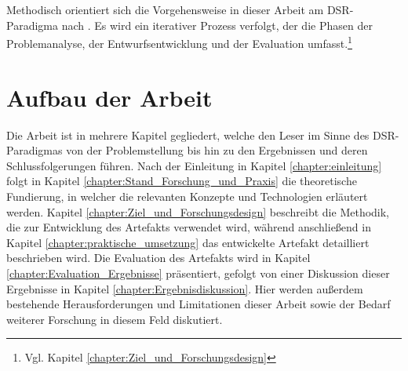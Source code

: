 Methodisch orientiert sich die Vorgehensweise in dieser Arbeit am \ac{DSR}-Paradigma nach \cite{hevner_design_2004}. Es wird ein iterativer Prozess verfolgt, der die Phasen der Problemanalyse, der Entwurfsentwicklung und der Evaluation umfasst.\footnote{Vgl. Kapitel \ref{chapter:Ziel_und_Forschungsdesign}}

\section{Aufbau der Arbeit}

Die Arbeit ist in mehrere Kapitel gegliedert, welche den Leser im Sinne des \ac{DSR}-Paradigmas von der Problemstellung bis hin zu den Ergebnissen und deren Schlussfolgerungen führen. Nach der Einleitung in Kapitel \ref{chapter:einleitung} folgt in Kapitel \ref{chapter:Stand_Forschung_und_Praxis} die theoretische Fundierung, in welcher die relevanten Konzepte und Technologien erläutert werden. Kapitel \ref{chapter:Ziel_und_Forschungsdesign} beschreibt die Methodik, die zur Entwicklung des Artefakts verwendet wird, während anschließend in Kapitel \ref{chapter:praktische_umsetzung} das entwickelte Artefakt detailliert beschrieben wird. Die Evaluation des Artefakts wird in Kapitel \ref{chapter:Evaluation_Ergebnisse} präsentiert, gefolgt von einer Diskussion dieser Ergebnisse in Kapitel \ref{chapter:Ergebnisdiskussion}. Hier werden außerdem bestehende Herausforderungen und Limitationen dieser Arbeit sowie der Bedarf weiterer Forschung in diesem Feld diskutiert.
